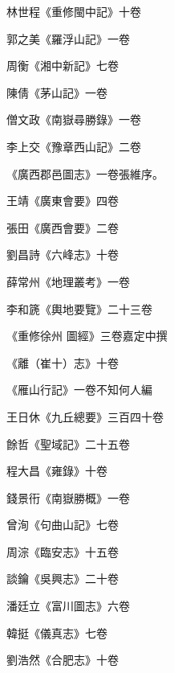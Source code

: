 \begin{pinyinscope}
 林世程《重修閩中記》十卷



 郭之美《羅浮山記》一卷



 周衡《湘中新記》七卷



 陳倩《茅山記》一卷



 僧文政《南嶽尋勝錄》一卷



 李上交《豫章西山記》二卷



 《廣西郡邑圖志》一卷張維序。



 王靖《廣東會要》四卷



 張田《廣西會要》二卷



 劉昌詩《六峰志》十卷



 薛常州《地理叢考》一卷



 李和篪《輿地要覽》二十三卷



 《重修徐州
 圖經》三卷嘉定中撰



 《離（崔十）志》十卷



 《雁山行記》一卷不知何人編



 王日休《九丘總要》三百四十卷



 餘哲《聖域記》二十五卷



 程大昌《雍錄》十卷



 錢景衎《南嶽勝概》一卷



 曾洵《句曲山記》七卷



 周淙《臨安志》十五卷



 談鑰《吳興志》二十卷



 潘廷立《富川圖志》六卷



 韓挺《儀真志》七卷



 劉浩然《合肥志》十卷




\end{pinyinscope}
